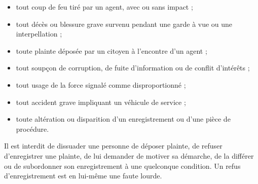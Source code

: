 

\begin{itemize}
  \item tout coup de feu tiré par un agent, avec ou sans impact ;
  \item tout décès ou blessure grave survenu pendant une garde à vue ou une interpellation ;
  \item toute plainte déposée par un citoyen à l'encontre d'un agent ;
  \item tout soupçon de corruption, de fuite d'information ou de conflit d'intérêts ;
  \item tout usage de la force signalé comme disproportionné ;
  \item tout accident grave impliquant un véhicule de service ;
  \item toute altération ou disparition d'un enregistrement ou d'une pièce de procédure.
\end{itemize}




\begin{interdit}
Il est interdit de dissuader une personne de déposer plainte, de refuser d'enregistrer une plainte, de lui demander de motiver sa démarche, de la différer ou de subordonner son enregistrement à une quelconque condition. Un refus d'enregistrement est en lui-même une faute lourde.
\end{interdit}


